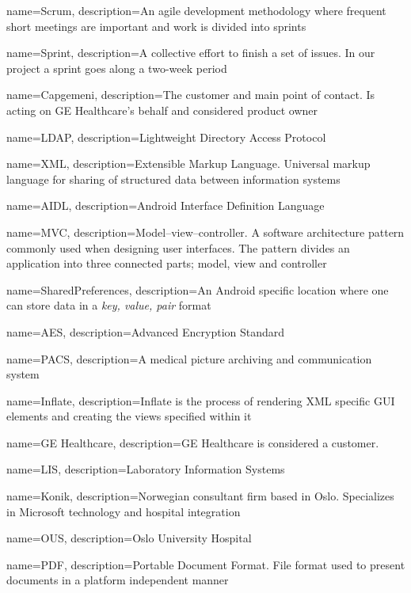 {
    name=Scrum,
    description={An agile development methodology where frequent short meetings are important and work is divided into sprints}
}

{
    name=Sprint,
    description={A collective effort to finish a set of issues. In our project a sprint goes along a two-week period}
}

{
    name=Capgemeni,
    description={The customer and main point of contact. Is acting on GE Healthcare's behalf and considered product owner}
}

{
    name=LDAP,
    description={Lightweight Directory Access Protocol}
}

{
    name=XML,
    description={Extensible Markup Language. Universal markup language for sharing of structured data between information systems}
}

{
    name=AIDL,
    description={Android Interface Definition Language}
}

{
    name=MVC,
    description={Model–view–controller. A software architecture pattern commonly used when designing user interfaces. The pattern divides an application into three connected parts; model, view and controller}
}

{
    name=SharedPreferences,
    description={An Android specific location where one can store data in a \emph{key, value, pair} format}
}

{
    name=AES,
    description={Advanced Encryption Standard}
}

{
    name=PACS,
    description={A medical picture archiving and communication system}
}

{
    name=Inflate,
    description={Inflate is the process of rendering XML specific GUI elements and creating the views specified within it}
}

{
    name=GE Healthcare,
    description={GE Healthcare is considered a customer.}
}

{
    name=LIS,
    description={Laboratory Information Systems}
}

{
    name=Konik,
    description={Norwegian consultant firm based in Oslo. Specializes in Microsoft technology and hospital integration}
}

{
    name=OUS,
    description={Oslo University Hospital}
}

{
    name=PDF,
    description={Portable Document Format. File format used to present documents in a platform independent manner}
}